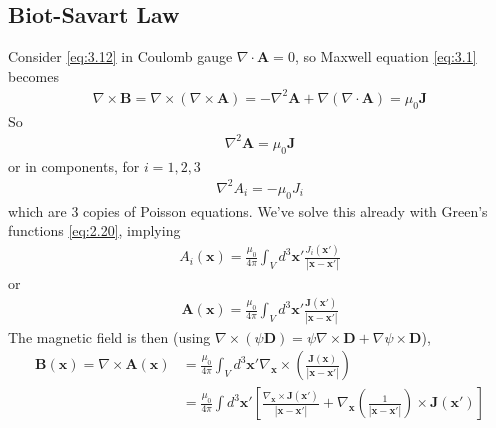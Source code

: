 \documentclass[a4paper]{article}
\begin{document}
\subsection{Biot-Savart Law}
Consider \eqref{eq:3.12} in Coulomb gauge $\nabla \cdot \mathbf{A} = 0$, so Maxwell equation \eqref{eq:3.1} becomes
\begin{equation*}
\begin{aligned}
\nabla \times \mathbf{B} = \nabla \times (\nabla \times \mathbf{A}) = -\nabla^2 \mathbf{A} + \nabla(\nabla\cdot \mathbf{A}) = \mu_0 \mathbf{J}
\end{aligned}
\end{equation*}
So
\begin{equation*}\tag{3.16} \label{eq:3.16}
\begin{aligned}
\nabla^2 \mathbf{A} = \mu_0 \mathbf{J}
\end{aligned}
\end{equation*}
or in components, for $i=1,2,3$
\begin{equation*}
\begin{aligned}
\nabla^2 A_i = -\mu_0 J_i
\end{aligned}
\end{equation*}
which are 3 copies of Poisson equations. We've solve this already with Green's functions \eqref{eq:2.20}, implying
\begin{equation*}
\begin{aligned}
A_i(\mathbf{x}) = \frac{\mu_0}{4\pi} \int_V d^3 \mathbf{x}' \frac{J_i(\mathbf{x}')}{|\mathbf{x}-\mathbf{x}'|}
\end{aligned}
\end{equation*}
or
\begin{equation*}\tag{3.17} \label{eq:3.17}
\begin{aligned}
\mathbf{A}(\mathbf{x}) = \frac{\mu_0}{4\pi} \int_V d^3 \mathbf{x}' \frac{\mathbf{J}(\mathbf{x}')}{|\mathbf{x}-\mathbf{x}'|}
\end{aligned}
\end{equation*}
The magnetic field is then (using $\nabla \times (\psi \mathbf{D}) = \psi \nabla \times \mathbf{D} + \nabla \psi \times \mathbf{D}$),
\begin{equation*}
\begin{aligned}
\mathbf{B}(\mathbf{x}) = \nabla \times \mathbf{A}(\mathbf{x}) &= \frac{\mu_0}{4\pi} \int_V d^3 \mathbf{x}' \nabla_\mathbf{x} \times \left( \frac{\mathbf{J}(\mathbf{x})}{|\mathbf{x}-\mathbf{x}'|} \right)\\
&= \frac{\mu_0}{4\pi} \int d^3 \mathbf{x}' \left[\frac{\nabla_\mathbf{x} \times \mathbf{J}(\mathbf{x}')}{|\mathbf{x}-\mathbf{x}'|} + \nabla_\mathbf{x} \left(\frac{1}{|\mathbf{x}-\mathbf{x}'|} \right) \times \mathbf{J} (\mathbf{x}')\right]
\end{aligned}
\end{equation*}
\end{document}
